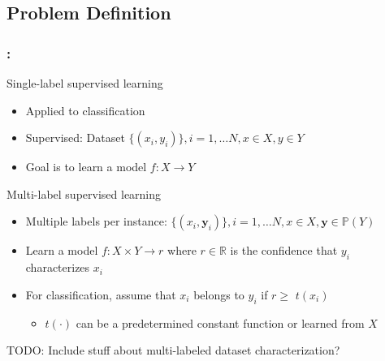 \documentclass{beamer}
\begin{document}
\subsection{Problem Definition}
\begin{frame}
\frametitle{\insertsection : \insertsubsection}
Single-label supervised learning
\begin{itemize}
	\item Applied to classification
	\item Supervised: Dataset $\{ (x_i, y_i)\}, i = 1, \dots N, x \in X, y \in Y$
	\item Goal is to learn a model $f: X \rightarrow Y$
\end{itemize}

Multi-label supervised learning
\begin{itemize}
	\item Multiple labels per instance: $\{ (x_i, \bm{y}_i)\}, i = 1, \dots N, x \in X, \bm{y} \in \mathbb{P}(Y)$
	\item Learn a model $f: X \times Y \rightarrow r$ where $r\in \mathbb{R}$ is the confidence that $y_i$ characterizes $x_i$
	\item For classification, assume that $x_i$ belongs to $y_i$ if $r \ge $ $t(x_i)$

		\begin{itemize}
			\item $t(\cdot)$ can be a predetermined constant function or learned from $X$
		\end{itemize}

\end{itemize}
TODO: Include stuff about multi-labeled dataset characterization?
\end{frame}

\end{document}
